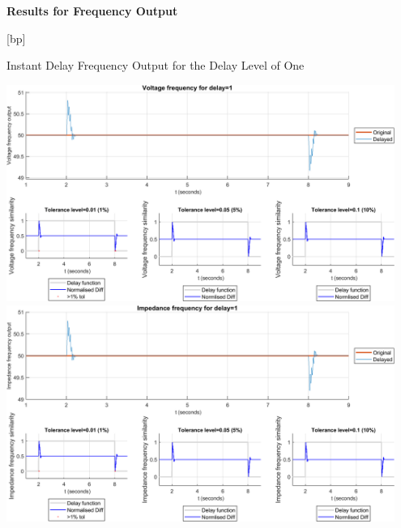 \newpage \textbf{Results for Frequency Output}
\begin{floatingfigure}[p]{\textwidth}[bp]
    \caption{Instant Delay Frequency Output for the Delay Level of One}
    \includegraphics[width=0.95\textwidth]{PMUsim-figures/DelayOf_1/Instant_vFrequency.png}    
  \includegraphics[width=0.95\textwidth]{PMUsim-figures/DelayOf_1/Instant_iFrequency.png}    
    \label{fig:PMUsim_One_Frequency}
\end{floatingfigure}
        \begin{small}
     \end{small}

